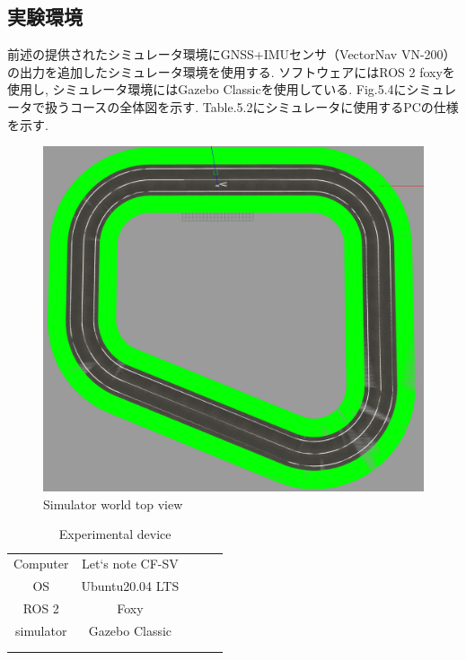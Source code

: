 \subsection{実験環境}
前述の提供されたシミュレータ環境にGNSS+IMUセンサ（VectorNav VN-200）の出力を追加したシミュレータ環境を使用する.
ソフトウェアにはROS 2 foxyを使用し, シミュレータ環境にはGazebo Classicを使用している.
Fig.5.4にシミュレータで扱うコースの全体図を示す.
Table.5.2にシミュレータに使用するPCの仕様を示す.

\begin{figure}[H]
  \centering
 \includegraphics[keepaspectratio, scale=0.3]
      {images/topviewsim.png}
 \caption{Simulator world top view}
 \label{fig:simulator}
\end{figure}

\begin{table}[H]
  \centering
  \caption{Experimental device}
  \begin{tabular}{cclll}
  \cline{1-2}
  Computer             & Let`s note CF-SV &  &  &  \\
  OS                   & Ubuntu20.04 LTS  &  &  &  \\
  ROS 2                & Foxy             &  &  &  \\
  simulator            & Gazebo Classic   &  &  &  \\
  \multicolumn{1}{l}{} &                  &  &  &  \\
  \multicolumn{1}{l}{} &                  &  &  & 
  \end{tabular}
\end{table}

